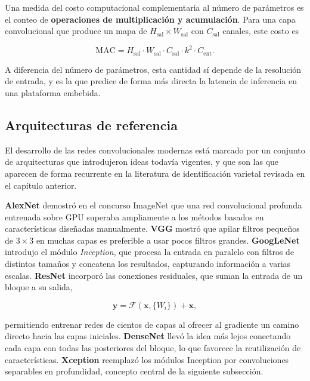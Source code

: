 Una medida del costo computacional complementaria al número de parámetros
es el conteo de \textbf{operaciones de multiplicación y acumulación}. Para
una capa convolucional que produce un mapa de $H_{\text{sal}} \times
W_{\text{sal}}$ con $C_{\text{sal}}$ canales, este costo es

\begin{equation}
\mathrm{MAC} = H_{\text{sal}} \cdot W_{\text{sal}} \cdot C_{\text{sal}} \cdot k^{2} \cdot C_{\text{ent}}.
\label{eq:macs}
\end{equation}

A diferencia del número de parámetros, esta cantidad sí depende de la
resolución de entrada, y es la que predice de forma más directa la latencia
de inferencia en una plataforma embebida.

\subsection{Arquitecturas de referencia}

El desarrollo de las redes convolucionales modernas está marcado por un
conjunto de arquitecturas que introdujeron ideas todavía vigentes, y que son
las que aparecen de forma recurrente en la literatura de identificación
varietal revisada en el capítulo anterior.

\textbf{AlexNet} \citep{krizhevsky2012} demostró en el concurso ImageNet
\citep{deng2009} que una red convolucional profunda entrenada sobre GPU
superaba ampliamente a los métodos basados en características diseñadas
manualmente. \textbf{VGG} \citep{simonyan2015} mostró que apilar filtros
pequeños de $3\times3$ en muchas capas es preferible a usar pocos filtros
grandes. \textbf{GoogLeNet} \citep{szegedy2015} introdujo el módulo
\textit{Inception}, que procesa la entrada en paralelo con filtros de
distintos tamaños y concatena los resultados, capturando información a
varias escalas. \textbf{ResNet} \citep{he2016} incorporó las conexiones
residuales, que suman la entrada de un bloque a su salida,

\begin{equation}
\mathbf{y} = \mathcal{F}(\mathbf{x}, \{W_{i}\}) + \mathbf{x},
\label{eq:residual}
\end{equation}

\noindent permitiendo entrenar redes de cientos de capas al ofrecer al
gradiente un camino directo hacia las capas iniciales. \textbf{DenseNet}
\citep{huang2017} llevó la idea más lejos conectando cada capa con todas las
posteriores del bloque, lo que favorece la reutilización de
características. \textbf{Xception} \citep{chollet2017} reemplazó los módulos
Inception por convoluciones separables en profundidad, concepto central de
la siguiente subsección.

